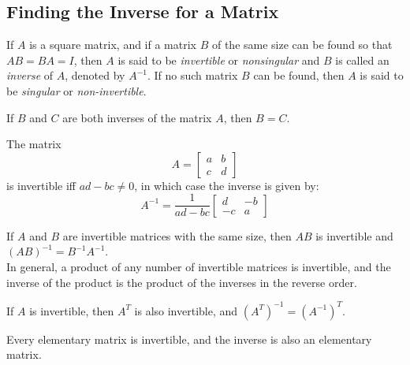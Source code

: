 \documentclass{report}
\begin{document}
		\subsection{Finding the Inverse for a Matrix}
		\begin{defn}[Inverse]
			If $A$ is a square matrix, and if a matrix $B$ of the same size can be found so that $AB=BA=I$, then $A$ is said to be \emph{invertible} or \emph{nonsingular} and $B$ is called an \emph{inverse} of $A$, denoted by $A^{-1}$. If no such matrix $B$ can be found, then $A$ is said to be \emph{singular} or \emph{non-invertible}.
		\end{defn}
		
		\begin{thm}
			If $B$ and $C$ are both inverses of the matrix $A$, then $B=C$.
		\end{thm}
		
		\begin{thm}\label{thm_inv_2_by_2}
			The matrix
			\begin{displaymath}
				A=
				\begin{bmatrix}
					a & b \\ c & d
				\end{bmatrix}
			\end{displaymath}
			is invertible iff $ad-bc\ne0$, in which case the inverse is given by:
			\begin{displaymath}
				A^{-1}=\frac{1}{ad-bc}
				\begin{bmatrix}
					d & -b \\ -c & a
				\end{bmatrix}
			\end{displaymath}
		\end{thm}
		
		\begin{thm}
			If $A$ and $B$ are invertible matrices with the same size, then $AB$ is invertible and $(AB)^{-1}=B^{-1}A^{-1}$.\\
			In general, a product of any number of invertible matrices is invertible, and the inverse of the product is the product of the inverses in the reverse order.
		\end{thm}
		
		\begin{thm}
			If $A$ is invertible, then $A^T$ is also invertible, and $(A^T)^{-1}=(A^{-1})^T$.
		\end{thm}
		
		\begin{thm}
			Every elementary matrix is invertible, and the inverse is also an elementary matrix.
		\end{thm}
		
\end{document}
